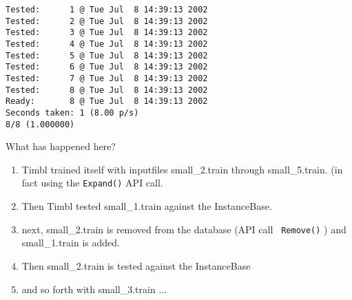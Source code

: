 \begin{verbatim}
Tested:      1 @ Tue Jul  8 14:39:13 2002
Tested:      2 @ Tue Jul  8 14:39:13 2002
Tested:      3 @ Tue Jul  8 14:39:13 2002
Tested:      4 @ Tue Jul  8 14:39:13 2002
Tested:      5 @ Tue Jul  8 14:39:13 2002
Tested:      6 @ Tue Jul  8 14:39:13 2002
Tested:      7 @ Tue Jul  8 14:39:13 2002
Tested:      8 @ Tue Jul  8 14:39:13 2002
Ready:       8 @ Tue Jul  8 14:39:13 2002
Seconds taken: 1 (8.00 p/s)
8/8 (1.000000)
\end{verbatim}

What has happened here?

\begin{enumerate}
\item Timbl trained itself with inputfiles small\_2.train through
small\_5.train. (in fact using the {\tt Expand()} API call.
\item Then Timbl tested small\_1.train against the InstanceBase.
\item next, small\_2.train is removed from the database (API call {\tt
Remove()} ) and small\_1.train is added.
\item Then small\_2.train is tested against the InstanceBase
\item and so forth with small\_3.train ...
\end{enumerate}



